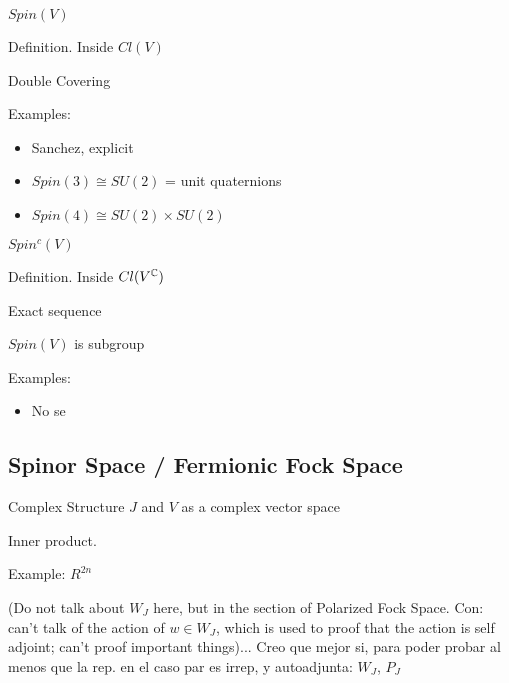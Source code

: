 \begin{frame}{$Spin(V)$} %

    Definition. Inside $Cl(V)$
    
    Double Covering
    
    Examples:
        \begin{itemize}
            
        \item Sanchez, explicit
        
        \item $Spin(3) \cong SU(2)$ = {unit quaternions}
        
        \item $Spin(4) \cong SU(2) \times SU(2)$
            
        \end{itemize}
\end{frame}

\begin{frame}{$Spin^c(V)$} %

    Definition. Inside $Cl(V^\mathbb C)$
    
    Exact sequence
    
    $Spin(V)$ is subgroup
    
    Examples:
        \begin{itemize}
            
        \item No se
            
        \end{itemize}

\end{frame}

\subsection{Spinor Space / Fermionic Fock Space}

\begin{frame}{Complex Structure $J$ and $V$ as a complex vector space} %

    Inner product.
    
    Example: $R^{2n}$
    
    (Do not talk about $W_J$ here, but in the section of Polarized Fock Space. Con: can't talk of the action of $w \in W_J$, which is used to proof that the action is self adjoint; can't proof important things)... Creo que mejor si, para poder probar al menos que la rep. en el caso par es irrep, y autoadjunta: $W_J$, $P_J$ 

\end{frame}

